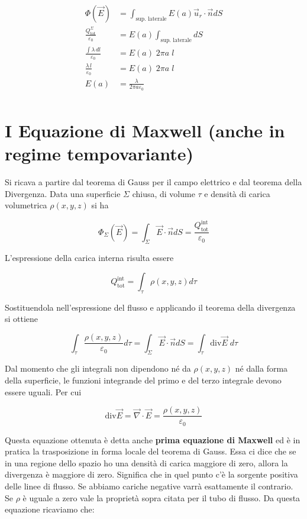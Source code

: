 \begin{align*}
	\Phi (\vec{E}) &= \int_{\text{sup. laterale}} E(a)\vec{u}_r \cdot \vec{n} dS \\
	\frac{Q_{\text{tot}}^{\Sigma}}{\varepsilon_0} &= E(a) \int_{\text{sup. laterale}} dS \tag*{T. di Gauss a primo membro} \\
	\frac{\int\lambda\,dl}{\varepsilon_0} &= E(a) \; 2\pi a\;l \\
	\frac{\lambda\,l}{\varepsilon_0} &= E(a) \; 2\pi a\;l \tag*{$\lambda$ è costante} \\
	E(a) &= \frac{\lambda}{2\pi a\varepsilon_0} \tag*{Campo elettrico generato da un filo} \\
\end{align*}

\section{I Equazione di Maxwell (anche in regime tempovariante)}

Si ricava a partire dal teorema di Gauss per il campo elettrico e dal teorema della Divergenza.
Data una superficie $\Sigma$ chiusa, di volume $\tau$ e densità di carica volumetrica $\rho (x,y,z)$ si ha

\[
	\Phi_{\Sigma}(\vec{E}) = \int_{\Sigma}\vec{E} \cdot \vec{n} dS = \frac{Q_{\text{tot}}^{\text{int}}}{\varepsilon_0}
\]

L'espressione della carica interna risulta essere

\[
	Q_{\text{tot}}^{\text{int}} = \int_{\tau} \rho (x,y,z)d\tau
\]

Sostituendola nell'espressione del flusso e applicando il teorema della divergenza si ottiene

\[
	\int_{\tau} \frac{\rho (x,y,z)}{\varepsilon_0}d\tau = \int_{\Sigma}\vec{E} \cdot \vec{n} dS = \int_{\tau} \text{div}\vec{E} \;d\tau
\]

Dal momento che gli integrali non dipendono né da $ \rho (x,y,z) $ né dalla forma della superficie, le funzioni integrande del primo e del terzo integrale devono essere uguali. Per cui

\[
	\boxed{\text{div}\vec{E} = \vec{\nabla} \cdot \vec{E} = \frac{\rho (x,y,z)}{\varepsilon_0}}
\]

Questa equazione ottenuta è detta anche \textbf{prima equazione di Maxwell} ed è in pratica la trasposizione in forma locale del teorema di Gauss. Essa ci dice che se in una regione dello spazio ho una densità di carica maggiore di zero, allora la divergenza è maggiore di zero. Significa che in quel punto c'è la sorgente positiva delle linee di flusso. Se abbiamo cariche negative varrà esattamente il contrario. Se $\rho$ è uguale a zero vale la proprietà sopra citata per il tubo di flusso.
Da questa equazione ricaviamo che:


